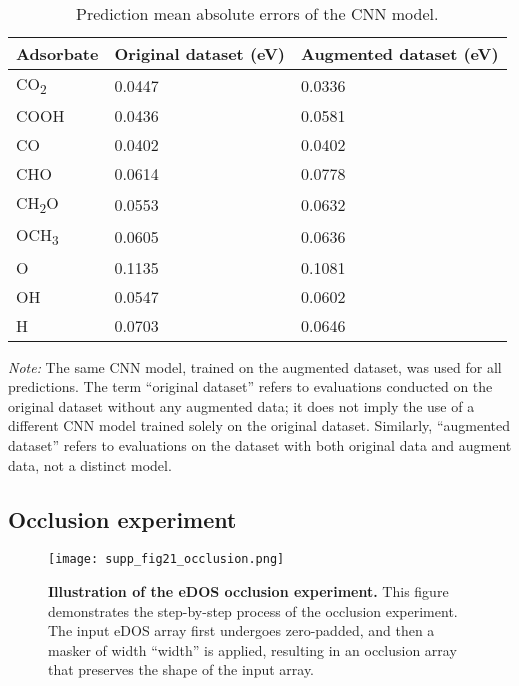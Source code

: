 \begin{table}[htbp]
\label{supp_table18:cnn_mae}
  \caption{Prediction mean absolute errors of the CNN model.}
  \small
  \begin{tabularx}{\textwidth}{@{}lXX@{}}
    \toprule
    Adsorbate             & Original dataset (eV)  & Augmented dataset (eV)  \\
    \midrule
    CO\textsubscript{2}   & 0.0447                 & 0.0336                  \\
    COOH                  & 0.0436                 & 0.0581                  \\
    CO                    & 0.0402                 & 0.0402                  \\
    CHO                   & 0.0614                 & 0.0778                  \\
    CH\textsubscript{2}O  & 0.0553                 & 0.0632                  \\
    OCH\textsubscript{3}  & 0.0605                 & 0.0636                  \\
    O                     & 0.1135                 & 0.1081                  \\
    OH                    & 0.0547                 & 0.0602                  \\
    H                     & 0.0703                 & 0.0646                  \\
    \bottomrule
  \end{tabularx}

  \smallskip

  \footnotesize\textit{Note:} The same CNN model, trained on the
    augmented dataset, was used for all predictions. The term ``original dataset''
    refers to evaluations conducted on the original dataset without any augmented data;
    it does not imply the use of a different CNN model trained solely on the original dataset.
    Similarly, ``augmented dataset'' refers to evaluations on the dataset with
    both original data and augment data, not a distinct model.
\end{table}

\subsection{Occlusion experiment}
\label{supp_sec3.5_occlusion}

\begin{figure}[htbp]
  \centering
  \texttt{[image: supp\_fig21\_occlusion.png]}
  \caption{\textbf{Illustration of the eDOS occlusion experiment.}
  This figure demonstrates the step-by-step process of the occlusion experiment.
  The input eDOS array first undergoes zero-padded, and then a masker of width ``width'' is applied,
  resulting in an occlusion array that preserves the shape of the input array.}
  \label{supp_fig21:occlusion}
\end{figure}

